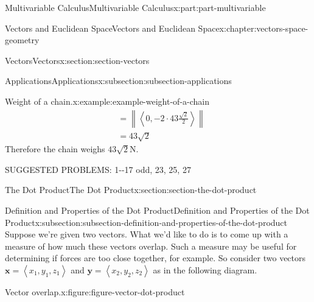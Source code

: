 \documentclass[twoside,10pt,]{book}
\numberwithin{equation}{part}
\newcommand{\norm}[1]{\left\| #1 \right\|}
\newcommand{\dotprod}[1]{\left\langle #1 \right\rangle}
\begin{document}
\begin{partptx}{Multivariable Calculus}{}{Multivariable Calculus}{}{}{x:part:part-multivariable}
\begin{chapterptx}{Vectors and Euclidean Space}{}{Vectors and Euclidean Space}{}{}{x:chapter:vectors-space-geometry}
\begin{sectionptx}{Vectors}{}{Vectors}{}{}{x:section:section-vectors}
\begin{subsectionptx}{Applications}{}{Applications}{}{}{x:subsection:subsection-applications}
\begin{example}{Weight of a chain.}{x:example:example-weight-of-a-chain}
\begin{align*}
& = \norm{\dotprod{0,-2\cdot43\frac{\sqrt{2}}{2}}}\\
& = 43\sqrt{2} 
\end{align*}
Therefore the chain weighs \(43\sqrt{2}\)\si{\newton}.%
\end{example}
%
SUGGESTED PROBLEMS: 1-{}-{}17 odd, 23, 25, 27%
\end{subsectionptx}
\end{sectionptx}
%
%
\typeout{************************************************}
\typeout{************************************************}
%
\begin{sectionptx}{The Dot Product}{}{The Dot Product}{}{}{x:section:section-the-dot-product}
%
%
\typeout{************************************************}
\typeout{************************************************}
%
\begin{subsectionptx}{Definition and Properties of the Dot Product}{}{Definition and Properties of the Dot Product}{}{}{x:subsection:subsection-definition-and-properties-of-the-dot-product}
Suppose we're given two vectors. What we'd like to do is to come up with a measure of how much these vectors overlap. Such a measure may be useful for determining if forces are too close together, for example. So consider two vectors \(\mathbf{x} = \dotprod{x_{1},y_{1},z_{1}}\) and \(\mathbf{y} = \dotprod{x_{2},y_{2},z_{2}}\) as in the following diagram.%
\begin{figureptx}{Vector overlap.}{x:figure:figure-vector-dot-product}{}%
\begin{image}{0.3}{0.4}{0.3}%
\end{image}
\end{figureptx}
\end{subsectionptx}
\end{sectionptx}
\end{chapterptx}
\end{partptx}
\end{document}
